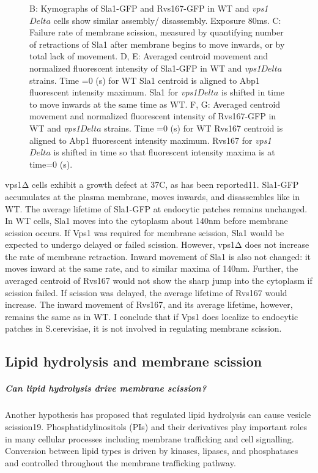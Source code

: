 \begin{figure}
{		B: Kymographs of Sla1-GFP and Rvs167-GFP in WT and \textit{vps1$Delta$} cells show similar assembly/ disassembly. Exposure 80ms.  
		C: Failure rate of membrane scission, measured by quantifying number of retractions of Sla1 after membrane begins to move inwards, or by total lack of movement. 
		D, E: Averaged centroid movement and normalized fluorescent intensity of Sla1-GFP in WT and \textit{vps1$Delta$} strains. Time =0 (s) for WT Sla1 centroid is aligned to Abp1 fluorescent intensity maximum. Sla1 for \textit{vps1$Delta$} is shifted in time to move inwards at the same time as WT. 
		F, G: Averaged centroid movement and normalized fluorescent intensity of Rvs167-GFP in WT and \textit{vps1$Delta$} strains. Time =0 (s) for WT Rvs167 centroid is aligned to Abp1 fluorescent intensity maximum. Rvs167 for \textit{vps1$Delta$} is shifted in time so that fluorescent intensity maxima is at time=0 (s).
		\label{fig3_vpsdel}}
	\end{figure}

	
	\vspace{5mm}
	vps1Δ cells exhibit a growth defect at 37C, as has been reported11. Sla1-GFP accumulates at the plasma membrane, moves inwards, and disassembles like in WT. The average lifetime of Sla1-GFP at endocytic patches remains unchanged. In WT cells, Sla1 moves into the cytoplasm about 140nm before membrane scission occurs. If Vps1 was required for membrane scission, Sla1 would be expected to undergo delayed or failed scission. However, vps1Δ does not increase the rate of membrane retraction. Inward movement of Sla1 is also not changed: it moves inward at the same rate, and to similar maxima of 140nm. Further, the averaged centroid of Rvs167 would not show the sharp jump into the cytoplasm if scission failed. If scission was delayed, the average lifetime of Rvs167 would increase. The inward movement of Rvs167, and its average lifetime, however, remains the same as in WT. I conclude that if Vps1 does localize to endocytic patches in S.cerevisiae, it is not involved in regulating membrane scission.  


	\subsection{Lipid hydrolysis and membrane scission}
	
	\subparagraph{Can lipid hydrolysis drive membrane scission?}
	Another hypothesis has proposed that regulated lipid hydrolysis can cause vesicle scission19. Phosphatidylinositols (PIs) and their derivatives play important roles in many cellular processes including membrane trafficking and cell signalling. Conversion between lipid types is driven by kinases, lipases, and phosphatases and controlled throughout the membrane trafficking pathway. 
	
